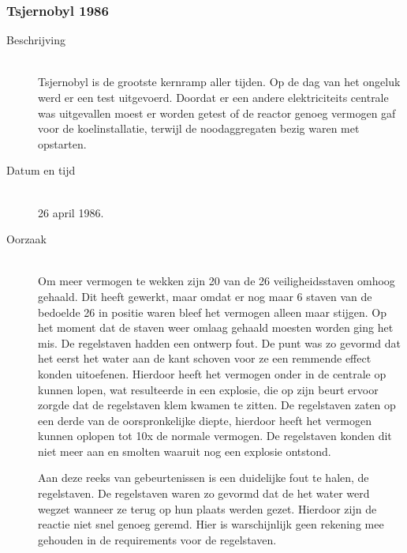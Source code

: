 \documentclass{article}%
\begin{document}
\clearpage %




\subsubsection{Tsjernobyl 1986}
\begin{description}
\item [Beschrijving] \hfill \\
Tsjernobyl is de grootste kernramp aller tijden. Op de dag van het ongeluk werd er een test uitgevoerd. Doordat er een andere elektriciteits centrale was uitgevallen moest er worden getest of de reactor genoeg vermogen gaf voor de koelinstallatie, terwijl de noodaggregaten bezig waren met opstarten. 

\item [Datum en tijd] \hfill \\
26 april 1986.

\item [Oorzaak] \hfill \\
Om meer vermogen te wekken zijn 20 van de 26 veiligheidsstaven omhoog gehaald. Dit heeft gewerkt, maar omdat er nog maar 6 staven van de bedoelde 26 in positie waren bleef het vermogen alleen maar stijgen. Op het moment dat de staven weer omlaag gehaald moesten worden ging het mis. De regelstaven hadden een ontwerp fout. De punt was zo gevormd dat het eerst het water aan de kant schoven voor ze een remmende effect konden uitoefenen. Hierdoor heeft het vermogen onder in de centrale op kunnen lopen, wat resulteerde in een explosie, die op zijn beurt ervoor zorgde dat de regelstaven klem kwamen te zitten. De regelstaven zaten op een derde van de oorspronkelijke diepte, hierdoor heeft het vermogen kunnen oplopen tot 10x de normale vermogen. De regelstaven konden dit niet meer aan en smolten waaruit nog een explosie ontstond.

Aan deze reeks van gebeurtenissen is een duidelijke fout te halen, de regelstaven. De regelstaven waren zo gevormd dat de het water werd wegzet wanneer ze terug op hun plaats werden gezet. Hierdoor zijn de reactie niet snel genoeg geremd. Hier is warschijnlijk geen rekening mee gehouden in de requirements voor de regelstaven.
\end{description}




\clearpage %
\end{document}
